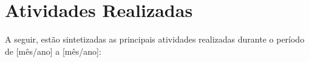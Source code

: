 
\section{Atividades Realizadas}

A seguir, estão sintetizadas as principais atividades realizadas durante o 
período de [mês/ano] a [mês/ano]:

